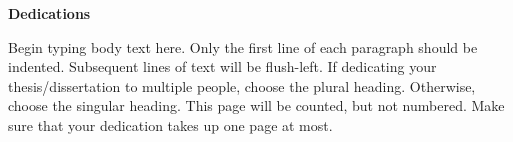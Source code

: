 
\begin{center}
\textbf{Dedications}
\end{center}

Begin typing body text here. Only the first line of each paragraph should be indented. Subsequent lines of text will be flush-left. If dedicating your thesis/dissertation to multiple people, choose the plural heading. Otherwise, choose the singular heading. This page will be counted, but not numbered. Make sure that your dedication takes up one page at most.

\newpage